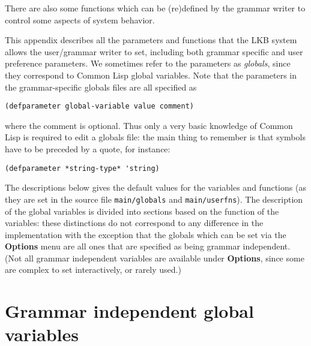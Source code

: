 \documentclass[12pt]{report}
\begin{document}
There are also some functions which can be (re)defined
by the grammar writer to control some aspects of system behavior.

This appendix describes all the parameters and functions
that the LKB system allows the
user/grammar writer to set, including both grammar specific and
user preference parameters.
We sometimes refer to the parameters as {\it globals}, since they
correspond to Common Lisp global variables. 
Note that the parameters in the grammar-specific globals files are 
all specified as
\begin{verbatim}
(defparameter global-variable value comment)
\end{verbatim}
where the comment is optional.
Thus only a very basic knowledge of Common Lisp is required to
edit a globals file: the main thing to remember is that symbols
have to be preceded by a quote, for instance:
\begin{verbatim}
(defparameter *string-type* 'string)
\end{verbatim}

The descriptions below gives the
default values for the variables and functions
(as they are set in the source file
{\tt main/globals} and {\tt main/userfns}). 
The description of the global variables is divided into sections
based on the function of the variables: these 
distinctions do not correspond to any difference in the implementation
with the exception that the globals which can be set via the
{\bf Options} menu are all ones that are specified as being
grammar independent.  (Not all grammar independent variables
are available under {\bf Options}, since some are complex to set
interactively, or rarely used.)

\section{Grammar independent global variables}
\label{indglob}
\end{document}
